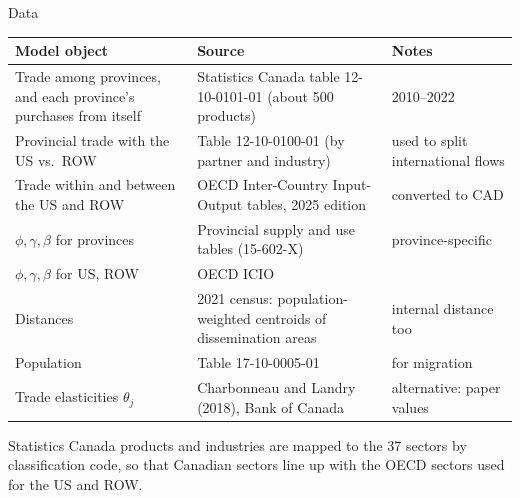 \documentclass[aspectratio=169,9pt,t]{beamer}
\begin{document}
\begin{frame}{Data}
  \small
  \begin{tabular}{@{}L{0.3\textwidth}L{0.36\textwidth}L{0.28\textwidth}@{}}
    \toprule
    Model object & Source & Notes\\
    \midrule
    Trade among provinces, and each province's purchases from itself
      & Statistics Canada table 12-10-0101-01 (about 500 products)
      & 2010--2022\\
    \addlinespace
    Provincial trade with the US vs.\ ROW
      & Table 12-10-0100-01 (by partner and industry)
      & used to split international flows\\
    \addlinespace
    Trade within and between the US and ROW
      & OECD Inter-Country Input-Output tables, 2025 edition
      & converted to CAD\\
    \addlinespace
    $\phi,\gamma,\beta$ for provinces
      & Provincial supply and use tables (15-602-X)
      & province-specific\\
    \addlinespace
    $\phi,\gamma,\beta$ for US, ROW
      & OECD ICIO & \\
    \addlinespace
    Distances
      & 2021 census: population-weighted centroids of dissemination areas
      & internal distance too\\
    \addlinespace
    Population & Table 17-10-0005-01 & for migration\\
    \addlinespace
    Trade elasticities $\theta_j$
      & Charbonneau and Landry (2018), Bank of Canada
      & alternative: paper values\\
    \bottomrule
  \end{tabular}

  \medskip
  Statistics Canada products and industries are mapped to the 37 sectors by
  classification code, so that Canadian sectors line up with the OECD
  sectors used for the US and ROW.
\end{frame}
\end{document}

